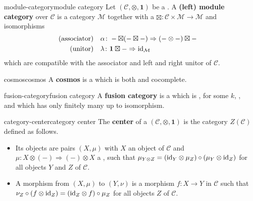 \begin{topic}{module-category}{module category}
    Let $(\mathcal{C}, \otimes, \textbf{1})$ be a . A \textbf{(left) module category} over $\mathcal{C}$ is a category $\mathcal{M}$ together with a  $\boxtimes \colon \mathcal{C} \times \mathcal{M} \to \mathcal{M}$ and  isomorphisms
    \[ \begin{aligned}
        \textup{(associator)}& \quad \alpha \colon - \boxtimes (- \boxtimes -) \Rightarrow (- \otimes -) \boxtimes - \\
        \textup{(unitor)}& \quad \lambda \colon \textbf{1} \boxtimes - \Rightarrow \textup{id}_\mathcal{M}
    \end{aligned} \]
    which are compatible with the associator and left and right unitor of $\mathcal{C}$.
\end{topic}

\begin{topic}{cosmos}{cosmos}
    A \textbf{cosmos} is a    which is both  and cocomplete.
\end{topic}

\begin{topic}{fusion-category}{fusion category}
    A \textbf{fusion category} is a  which is ,  for some  $k$, , and which has only finitely many  up to isomorphism.
\end{topic}

\begin{topic}{category-center}{category center}
    The \textbf{center} of a  $(\mathcal{C}, \otimes, \textbf{1})$ is the category $Z(\mathcal{C})$ defined as follows.
    \begin{itemize}
        \item Its objects are pairs $(X, \mu)$ with $X$ an object of $\mathcal{C}$ and $\mu \colon X \otimes (-) \Rightarrow (-) \otimes X$ a , such that $\mu_{Y \otimes Z} = (\textup{id}_Y \otimes \mu_Z) \circ (\mu_Y \otimes \textup{id}_Z)$ for all objects $Y$ and $Z$ of $\mathcal{C}$.
        \item A morphism from $(X, \mu)$ to $(Y, \nu)$ is a morphism $f \colon X \to Y$ in $\mathcal{C}$ such that $\nu_Z \circ (f \otimes \textup{id}_Z) = (\textup{id}_Z \otimes f) \circ \mu_Z$ for all objects $Z$ of $\mathcal{C}$.
    \end{itemize}
\end{topic}
